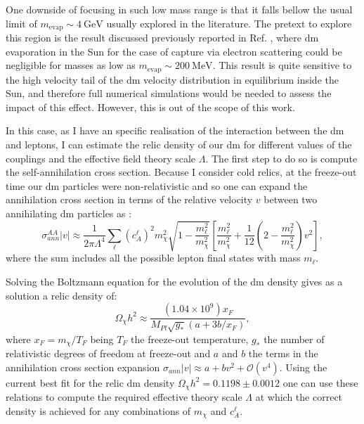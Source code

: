 One downside of focusing in such low mass range is that it falls bellow the usual limit of $m_{\mathrm{evap}} \sim 4 \ \mathrm{GeV}$ usually explored in the literature. The pretext to explore this region is the result discussed previously reported in Ref. \cite{Palomares2017}, where \gls{dm} evaporation in the Sun for the case of capture via electron scattering could be negligible for masses as low as $m_{\mathrm{evap}} \sim 200 \ \mathrm{MeV}$. This result is quite sensitive to the high velocity tail of the \gls{dm} velocity distribution in equilibrium inside the Sun, and therefore full numerical simulations would be needed to assess the impact of this effect. However, this is out of the scope of this work.

In this case, as I have an specific realisation of the interaction between the \gls{dm} and leptons, I can estimate the relic density of our \gls{dm} for different values of the couplings and the effective field theory scale $\Lambda$. The first step to do so is compute the self-annihilation cross section. Because I consider cold relics, at the freeze-out time our \gls{dm} particles were non-relativistic and so one can expand the annihilation cross section in terms of the relative velocity $v$ between two annihilating \gls{dm} particles as \cite{Beltran2008}:
\begin{equation}\label{7.4}
	\sigma_{ann}^{AA}|v| \approx \frac{1}{2\pi\Lambda^{4}} \sum_{\ell} \left(c_{A}^{\ell}\right)^{2} m_{\chi}^{2} \sqrt{1-\frac{m_{\ell}^{2}}{m_{\chi}^{2}}} \left[\frac{m_{\ell}^{2}}{m_{\chi}^{2}}+\frac{1}{12}\left(2-\frac{m_{\ell}^{2}}{m_{\chi}^{2}}\right)v^{2}\right],
\end{equation}
where the sum includes all the possible lepton final states with mass $m_{\ell}$.

Solving the Boltzmann equation for the evolution of the \gls{dm} density gives as a solution a relic density of:
\begin{equation}\label{7.5}
	\Omega_{\chi} h^{2} \approx \frac{(1.04 \times 10^{9}) x_{F}}{M_{Pl} \sqrt{g_{*}}(a+3b/x_{F})},
\end{equation}
where $x_{F} = m_{\chi}/T_{F}$ being $T_{F}$ the freeze-out temperature, $g_{*}$ the number of relativistic degrees of freedom at freeze-out and $a$ and $b$ the terms in the annihilation cross section expansion $\sigma_{ann} |v| \approx a + b v^{2} + \mathcal{O}(v^{4})$. Using the current best fit for the relic \gls{dm} density $\Omega_{\chi} h^{2} = 0.1198 \pm 0.0012$ \cite{Planck2018} one can use these relations to compute the required effective theory scale $\Lambda$ at which the correct density is achieved for any combinations of $m_{\chi}$ and $c_{A}^{\ell}$.

